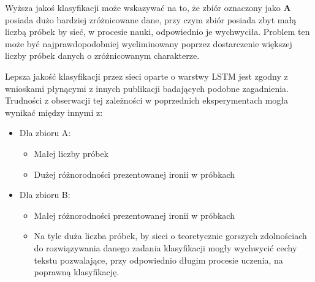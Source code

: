 Wyższa jakoś klasyfikacji może wskazywać na to, że zbiór oznaczony jako \textbf{A} posiada dużo bardziej zróżnicowane dane, przy czym zbiór posiada zbyt małą liczbą próbek by sieć, w procesie nauki, odpowiednio je wychwyciła. Problem ten może być najprawdopodobniej wyeliminowany poprzez dostarczenie większej liczby próbek danych o zróżnicowanym charakterze.

Lepsza jakość klasyfikacji przez sieci oparte o warstwy LSTM jest zgodny z wnioskami płynącymi z innych publikacji badających podobne zagadnienia. Trudności z obserwacji tej zależności w poprzednich eksperymentach mogła wynikać między innymi z:


\begin{itemize}

    \item Dla zbioru A:
          \begin{itemize}
              \item Małej liczby próbek
              \item Dużej różnorodności prezentowanej ironii w próbkach
          \end{itemize}

    \item Dla zbioru B:
          \begin{itemize}
              \item Małej różnorodności prezentowanej ironii w próbkach
              \item Na tyle duża liczba próbek, by sieci o teoretycznie gorszych zdolnościach do rozwiązywania danego zadania klasyfikacji mogły wychwycić cechy tekstu pozwalające, przy odpowiednio długim procesie uczenia, na poprawną klasyfikację.
          \end{itemize}

\end{itemize}






